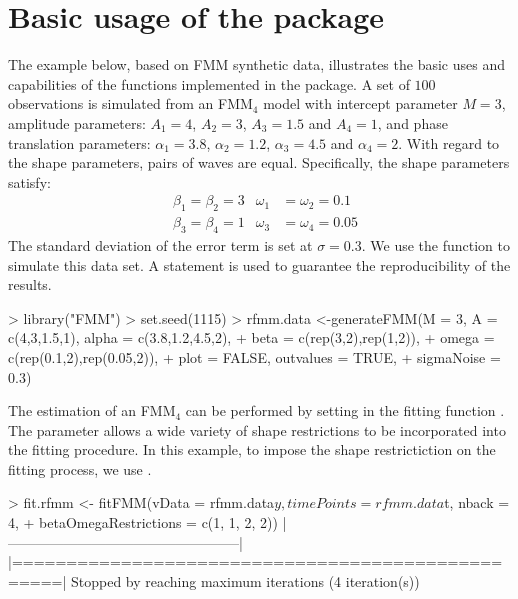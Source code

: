\section{Basic usage of the  package} \label{sec:use}
The example below, based on FMM synthetic data, illustrates the basic uses and capabilities of the functions implemented in the  package. 
A set of $100$ observations is simulated from an FMM$_4$ model with intercept parameter $M = 3$, amplitude parameters: $ A_1 = 4$, $A_2 = 3$, $A_3 = 1.5$ and $A_4 = 1$, and phase translation parameters: $\alpha_1 = 3.8$, $\alpha_2 = 1.2$, $\alpha_3 = 4.5$ and $\alpha_4 = 2$. With regard to the shape parameters, pairs of waves are equal. Specifically, the shape parameters satisfy:
%
\begin{align*}
  & \beta_1 = \beta_2 = 3  & \omega_1 & =\omega_2 = 0.1\\
  & \beta_3 = \beta_4 = 1  & \omega_3 & =\omega_4 = 0.05
\end{align*}
%
The standard deviation of the error term is set at $\sigma = 0.3$. We use the function  to simulate this data set. A  statement is used to guarantee the reproducibility of the results.
%
\begin{example}
> library("FMM")
> set.seed(1115)
> rfmm.data <-generateFMM(M = 3, A = c(4,3,1.5,1), alpha = c(3.8,1.2,4.5,2),
+                         beta = c(rep(3,2),rep(1,2)), 
+                         omega = c(rep(0.1,2),rep(0.05,2)),
+                         plot = FALSE, outvalues = TRUE,
+                         sigmaNoise = 0.3)
\end{example}
%
The estimation of an FMM$_4$ can be performed by setting  in the fitting function .
The  parameter allows a wide variety of shape restrictions to be incorporated into the fitting procedure. In this example, to impose the shape restrictiction on the fitting process, we use .

%
\begin{example}
> fit.rfmm <- fitFMM(vData = rfmm.data$y, timePoints = rfmm.data$t, nback = 4,
+                    betaOmegaRestrictions = c(1, 1, 2, 2))
|--------------------------------------------------|
|==================================================|
 Stopped by reaching maximum iterations (4 iteration(s)) 
\end{example}
%

